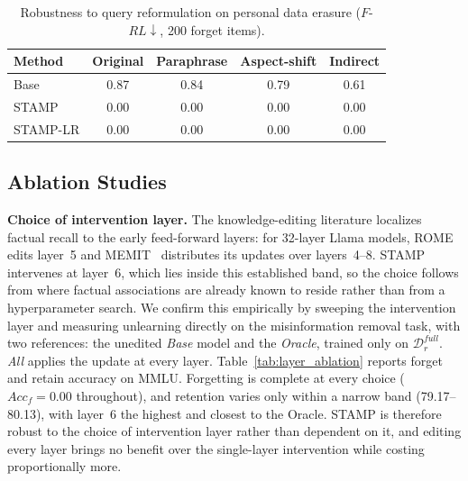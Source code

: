 \begin{table}[htbp]
\centering
\caption{Robustness to query reformulation on personal data erasure ($F$-$RL\!\downarrow$, 200 forget items).}
\label{tab:reformulation}
\small
\renewcommand{\arraystretch}{1.3}
\setlength{\tabcolsep}{8pt}
\begin{tabular}{lcccc}
\toprule
\textbf{Method} & \textbf{Original} & \textbf{Paraphrase} & \textbf{Aspect-shift} & \textbf{Indirect} \\
\midrule
Base & 0.87 & 0.84 & 0.79 & 0.61 \\
\rowcolor{gray!15}
STAMP & 0.00 & 0.00 & 0.00 & 0.00 \\
STAMP-LR & 0.00 & 0.00 & 0.00 & 0.00 \\
\bottomrule
\end{tabular}
\end{table}


\subsection{Ablation Studies}\label{subsec:rp_ablation}

\noindent
\textbf{Choice of intervention layer.}\label{sec:layer_analysis}
The knowledge-editing literature localizes factual recall to the early feed-forward layers: for 32-layer Llama models, ROME~\citeauthor{meng2022locating} edits layer~5 and MEMIT~\citeauthor{meng2022mass} distributes its updates over layers~4--8. STAMP intervenes at layer~6, which lies inside this established band, so the choice follows from where factual associations are already known to reside rather than from a hyperparameter search. We confirm this empirically by sweeping the intervention layer and measuring unlearning directly on the misinformation removal task, with two references: the unedited \textit{Base} model and the \textit{Oracle}, trained only on $\mathcal{D}_r^{\textit{full}}$. \textit{All} applies the update at every layer. Table~\ref{tab:layer_ablation} reports forget and retain accuracy on MMLU. Forgetting is complete at every choice ($Acc_f = 0.00$ throughout), and retention varies only within a narrow band (79.17--80.13), with layer~6 the highest and closest to the Oracle. STAMP is therefore robust to the choice of intervention layer rather than dependent on it, and editing every layer brings no benefit over the single-layer intervention while costing proportionally more.


